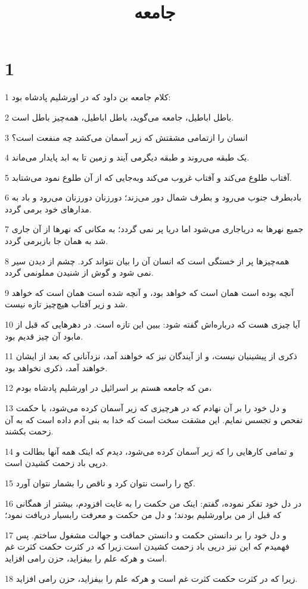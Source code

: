 

\title{جامعه}

 
\chapter{1}

\par 1 کلام جامعه بن داود که در اورشلیم پادشاه بود:
\par 2 باطل اباطیل، جامعه می‌گوید، باطل اباطیل، همه‌چیز باطل است.
\par 3 انسان را ازتمامی مشقتش که زیر آسمان می‌کشد چه منفعت است؟
\par 4 یک طبقه می‌روند و طبقه دیگرمی آیند و زمین تا به ابد پایدار می‌ماند.
\par 5 آفتاب طلوع می‌کند و آفتاب غروب می‌کند وبه‌جایی که از آن طلوع نمود می‌شتابد.
\par 6 بادبطرف جنوب می‌رود و بطرف شمال دور می‌زند؛ دورزنان دورزنان می‌رود و باد به مدارهای خود برمی گردد.
\par 7 جمیع نهرها به دریاجاری می‌شود اما دریا پر نمی گردد؛ به مکانی که نهرها از آن جاری شد به همان جا بازبرمی گردد.
\par 8 همه‌چیزها پر از خستگی است که انسان آن را بیان نتواند کرد. چشم از دیدن سیر نمی شود و گوش از شنیدن مملونمی گردد.
\par 9 آنچه بوده است همان است که خواهد بود، و آنچه شده است همان است که خواهد شد و زیر آفتاب هیچ‌چیز تازه نیست.
\par 10 آیا چیزی هست که درباره‌اش گفته شود: ببین این تازه است. در دهرهایی که قبل از مابود آن چیز قدیم بود.
\par 11 ذکری از پیشینیان نیست، و از آیندگان نیز که خواهند آمد، نزدآنانی که بعد از ایشان خواهند آمد، ذکری نخواهد بود.
\par 12 من که جامعه هستم بر اسرائیل در اورشلیم پادشاه بودم،
\par 13 و دل خود را بر آن نهادم که در هرچیزی که زیر آسمان کرده می‌شود، با حکمت تفحص و تجسس نمایم. این مشقت سخت است که خدا به بنی آدم داده است که به آن زحمت بکشند.
\par 14 و تمامی کارهایی را که زیر آسمان کرده می‌شود، دیدم که اینک همه آنها بطالت و درپی باد زحمت کشیدن است.
\par 15 کج را راست نتوان کرد و ناقص را بشمار نتوان آورد.
\par 16 در دل خود تفکر نموده، گفتم: اینک من حکمت را به غایت افزودم، بیشتر از همگانی که قبل از من براورشلیم بودند؛ و دل من حکمت و معرفت رابسیار دریافت نمود؛
\par 17 و دل خود را بر دانستن حکمت و دانستن حماقت و جهالت مشغول ساختم. پس فهمیدم که این نیز در‌پی باد زحمت کشیدن است.زیرا که در کثرت حکمت کثرت غم است و هر‌که علم را بیفزاید، حزن رامی افزاید.
\par 18 زیرا که در کثرت حکمت کثرت غم است و هر‌که علم را بیفزاید، حزن رامی افزاید.
 
